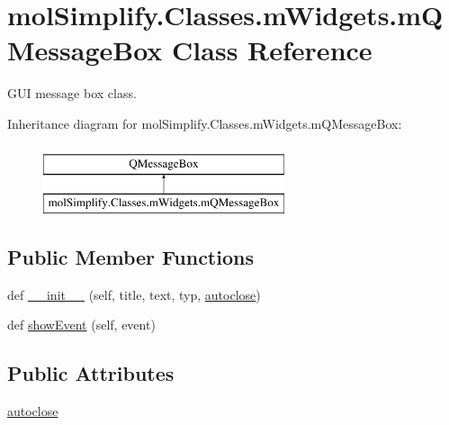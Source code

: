 \hypertarget{classmolSimplify_1_1Classes_1_1mWidgets_1_1mQMessageBox}{}\section{mol\+Simplify.\+Classes.\+m\+Widgets.\+m\+Q\+Message\+Box Class Reference}
\label{classmolSimplify_1_1Classes_1_1mWidgets_1_1mQMessageBox}


G\+UI message box class.  


Inheritance diagram for mol\+Simplify.\+Classes.\+m\+Widgets.\+m\+Q\+Message\+Box\+:\begin{figure}[H]
\begin{center}
\leavevmode
\includegraphics[height=2.000000cm]{classmolSimplify_1_1Classes_1_1mWidgets_1_1mQMessageBox}
\end{center}
\end{figure}
\subsection*{Public Member Functions}
\begin{DoxyCompactItemize}
\item 
def \hyperlink{classmolSimplify_1_1Classes_1_1mWidgets_1_1mQMessageBox_a41a5c729e25eee8d1cfd9ec661567a68}{\+\_\+\+\_\+init\+\_\+\+\_\+} (self, title, text, typ, \hyperlink{classmolSimplify_1_1Classes_1_1mWidgets_1_1mQMessageBox_a72e0288a3ae9c22560124d97cdaa93e2}{autoclose})
\item 
def \hyperlink{classmolSimplify_1_1Classes_1_1mWidgets_1_1mQMessageBox_ac04dd28ad94321c6f561f7ca38c0a3c6}{show\+Event} (self, event)
\end{DoxyCompactItemize}
\subsection*{Public Attributes}
\begin{DoxyCompactItemize}
\item 
\hyperlink{classmolSimplify_1_1Classes_1_1mWidgets_1_1mQMessageBox_a72e0288a3ae9c22560124d97cdaa93e2}{autoclose}
\end{DoxyCompactItemize}


